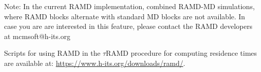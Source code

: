 Note: 
In the current RAMD implementation, combined RAMD-MD simulations, where RAMD blocks alternate with standard MD blocks are not available. In case you are are interested in this feature, please contact the RAMD developers at mcmsoft@h-its.org

Scripts for using RAMD in the $\tau$RAMD procedure for computing residence times are available at: \url{https://www.h-its.org/downloads/ramd/}.
 

